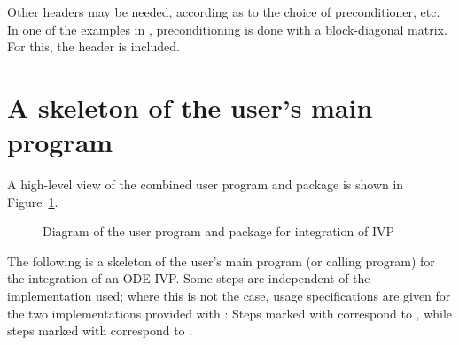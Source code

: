 Other headers may be needed, according as to the choice of preconditioner,
etc. In one of the examples in \cite{cvode2.2.0_ex}, preconditioning is done
with a block-diagonal matrix. For this, the header
 is included.

\section{A skeleton of the user's main program}\label{ss:skeleton_sim}

A high-level view of the combined user program and {\cvode} package is
shown in Figure~\ref{f:sim_overview}.
\begin{figure}
\centerline{}
\caption {Diagram of the user program and 
  {\cvode} package for integration of IVP}\label{f:sim_overview}
\end{figure}
The following is a skeleton of the user's main program (or calling
program) for the integration of an ODE IVP. Some steps are independent
of the {\nvector} implementation used; where this is not the case, usage
specifications are given for the two implementations provided with {\cvode}:
Steps marked with {\p} correspond to  {\nvecp}, while steps marked with
{\s} correspond to {\nvecs}.
